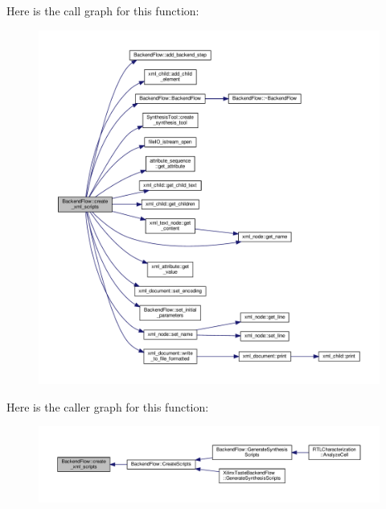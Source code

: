 Here is the call graph for this function\+:
\nopagebreak
\begin{figure}[H]
\begin{center}
\leavevmode
\includegraphics[width=350pt]{da/d75/classBackendFlow_a8c03d242a9fa1394a2721c9c5363e6ed_cgraph}
\end{center}
\end{figure}
Here is the caller graph for this function\+:
\nopagebreak
\begin{figure}[H]
\begin{center}
\leavevmode
\includegraphics[width=350pt]{da/d75/classBackendFlow_a8c03d242a9fa1394a2721c9c5363e6ed_icgraph}
\end{center}
\end{figure}
\mbox{\label{classBackendFlow_a8a639cfcc249bb8242365356727b3c4c}} 
